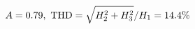 \documentclass[preview]{standalone}
\begin{document}
\begin{align*}
\special{dvisvgm:raw <g id='unique000'>}A=0.79,\ \text{THD}=\sqrt{H_2^2+H_3^2}/H_1=14.4\%\special{dvisvgm:raw </g>}
\end{align*}
\end{document}
